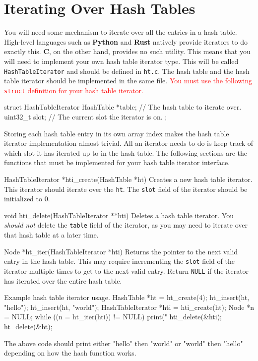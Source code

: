 \section{Iterating Over Hash Tables}\label{sec:iterator}

You will need some mechanism to iterate over all the entries in a hash table.
High-level languages such as \textbf{Python} and \textbf{Rust} natively provide
iterators to do exactly this. \textbf{C}, on the other hand, provides no such
utility. This means that you will need to implement your own hash table iterator
type. This will be called \texttt{HashTableIterator} and should be defined in
\texttt{ht.c}. The hash table and the hash table iterator should be implemented
in the same file. \textcolor{red}{You must use the following \texttt{struct}
definition for your hash table iterator.}

\begin{clisting}{}
struct HashTableIterator {
    HashTable *table; // The hash table to iterate over.
    uint32_t slot;    // The current slot the iterator is on.
};
\end{clisting}

Storing each hash table entry in its own array index makes the hash table
iterator implementation almost trivial. All an iterator needs to do is keep
track of which slot it has iterated up to in the hash table. The following
sections are the functions that must be implemented for your hash table iterator
interface.

\begin{funcdoc}{HashTableIterator *hti\_create(HashTable *ht)}
  Creates a new hash table iterator. This iterator should iterate over the
  \texttt{ht}. The \texttt{slot} field of the iterator should be initialized to
  0.
\end{funcdoc}

\begin{funcdoc}{void hti\_delete(HashTableIterator **hti)}
  Deletes a hash table iterator. You \emph{should not} delete the \texttt{table}
  field of the iterator, as you may need to iterate over that hash table at a
  later time.
\end{funcdoc}

\begin{funcdoc}{Node *ht\_iter(HashTableIterator *hti)}
  Returns the pointer to the next valid entry in the hash table. This may
  require incrementing the \texttt{slot} field of the iterator multiple times to
  get to the next valid entry. Return \texttt{NULL} if the iterator has iterated
  over the entire hash table.
  \begin{clisting}{Example hash table iterator usage.}
HashTable *ht = ht_create(4);
ht_insert(ht, "hello");
ht_insert(ht, "world");
HashTableIterator *hti = hti_create(ht);
Node *n = NULL;
while ((n = ht_iter(hti)) != NULL) {
  print("%
}
hti_delete(&hti);
ht_delete(&ht);
  \end{clisting}
  The above code should print either "hello" then "world" or "world" then
  "hello" depending on how the hash function works.
\end{funcdoc}

